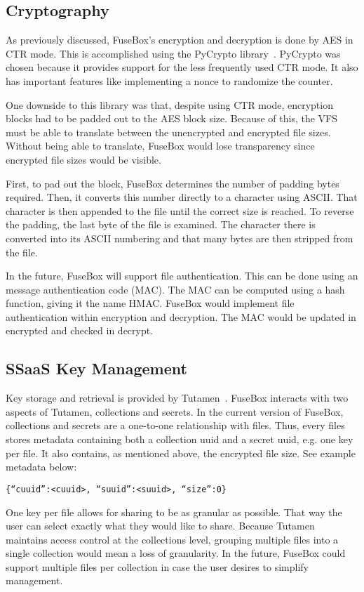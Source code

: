 \documentclass[11pt,twocolumn,letterpaper]{article}
\newcommand{\appname}{FuseBox }
\newcommand{\appnameWOspace}{FuseBox}
\newcommand{\custos}{Tutamen }
\newcommand{\custosWOspace}{Tutamen}
\begin{document}
\subsection{Cryptography}
\label{sec:encimp}
As previously discussed, \appnameWOspace's encryption and decryption
is done by AES in CTR mode. This is accomplished using the  PyCrypto
library~\cite{pycrypto}.
PyCrypto was chosen because it provides support for the less
frequently used CTR
mode. It also has important features like implementing a nonce to
randomize the counter. 
\par One downside to this library was that, despite using CTR mode,
encryption blocks had to be padded out to the AES block size. Because
of this, the VFS must be able to translate between the unencrypted and
encrypted file sizes. Without being able to translate, \appname would
lose transparency since encrypted file sizes would be visible. 
\par First, to pad out the block, \appname determines the number of
padding bytes required. Then, it converts this number directly to a
character using ASCII. That character is then appended to the file
until the correct size is reached. To reverse the padding, the last
byte of the file is examined. The character there is converted into
its ASCII numbering and that many bytes are then stripped from the
file. 
\par In the future, \appname will support file authentication. This
can be done using an message authentication code (MAC). The MAC can be
computed using a hash function, giving it the name HMAC. \appname
would implement file authentication within encryption and
decryption. The MAC would be updated in encrypted and checked in
decrypt. 

\subsection{SSaaS Key Management}
\label{sec:ksimp}
Key storage and retrieval is provided
by \custosWOspace~\cite{Pytutamen}. \appname interacts with two aspects
of \custosWOspace, collections and secrets. In the current version
of \appnameWOspace, collections and secrets are a one-to-one
relationship with files. Thus, every files stores metadata containing
both a collection uuid and a secret uuid, e.g. one key per file. It also contains, as
mentioned above, the encrypted file size. See example metadata below:
\begin{center}
\noindent\texttt{\{``cuuid'':<cuuid>, ``suuid'':<suuid>, ``size'':0\}}
\hspace{\columnwidth}
\end{center}
\par One key per file allows for sharing to be as granular as
possible. That way the user can select exactly what they would like to share.
Because \custos maintains access control at the collections level, grouping multiple
files into a single collection would mean a loss of granularity. In
the future, \appname could support multiple files per collection in
case the user desires to simplify management. 
\end{document}

